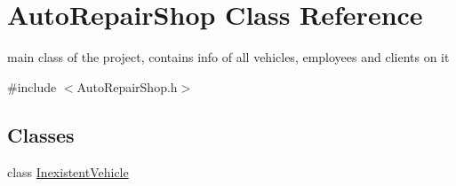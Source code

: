 \hypertarget{class_auto_repair_shop}{}\section{Auto\+Repair\+Shop Class Reference}
\label{class_auto_repair_shop}


main class of the project, contains info of all vehicles, employees and clients on it  




{\ttfamily \#include $<$Auto\+Repair\+Shop.\+h$>$}

\subsection*{Classes}
\begin{DoxyCompactItemize}
\item 
class \hyperlink{class_auto_repair_shop_1_1_inexistent_vehicle}{Inexistent\+Vehicle}
\end{DoxyCompactItemize}
